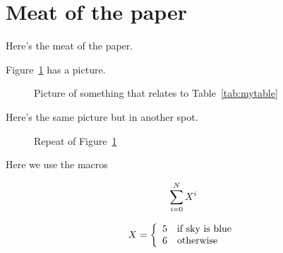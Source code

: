 \section{Meat of the paper}

Here's the meat of the paper.

Figure~\ref{fig:picture} has a picture.

\begin{figure}[htbp]
\centerline{}
\caption{\label{fig:picture} Picture of something that relates to Table~\ref{tab:mytable}}
\end{figure}

\noindent Here's the same picture but in another spot.
\begin{figure}[htbp]
\centerline{}
\caption{\label{fig:repeatpicture} Repeat of Figure~\ref{fig:picture}}
\end{figure}

Here we use the macros

\[\summation{i=0}{N}{X^i}\]

\[\cond{X}{5}{if sky is blue}{6}{otherwise}\]
